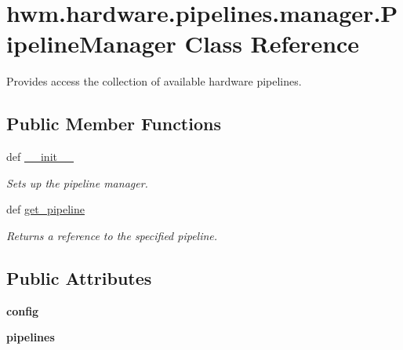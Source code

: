 \hypertarget{classhwm_1_1hardware_1_1pipelines_1_1manager_1_1_pipeline_manager}{\section{hwm.\-hardware.\-pipelines.\-manager.\-Pipeline\-Manager Class Reference}
\label{classhwm_1_1hardware_1_1pipelines_1_1manager_1_1_pipeline_manager}
}


Provides access the collection of available hardware pipelines.  


\subsection*{Public Member Functions}
\begin{DoxyCompactItemize}
\item 
def \hyperlink{classhwm_1_1hardware_1_1pipelines_1_1manager_1_1_pipeline_manager_a88a42b5d8f14bb37d5618cd29452126d}{\-\_\-\-\_\-init\-\_\-\-\_\-}
\begin{DoxyCompactList}\small\item\em Sets up the pipeline manager. \end{DoxyCompactList}\item 
def \hyperlink{classhwm_1_1hardware_1_1pipelines_1_1manager_1_1_pipeline_manager_acd2d1d93204110d7256c8cbb34cde804}{get\-\_\-pipeline}
\begin{DoxyCompactList}\small\item\em Returns a reference to the specified pipeline. \end{DoxyCompactList}\end{DoxyCompactItemize}
\subsection*{Public Attributes}
\begin{DoxyCompactItemize}
\item 
\hypertarget{classhwm_1_1hardware_1_1pipelines_1_1manager_1_1_pipeline_manager_a11e66d6149717d994105088073f3233b}{{\bfseries config}}\label{classhwm_1_1hardware_1_1pipelines_1_1manager_1_1_pipeline_manager_a11e66d6149717d994105088073f3233b}

\item 
\hypertarget{classhwm_1_1hardware_1_1pipelines_1_1manager_1_1_pipeline_manager_a3984be455a8589fa8cc5ec28cb2ffb80}{{\bfseries pipelines}}\label{classhwm_1_1hardware_1_1pipelines_1_1manager_1_1_pipeline_manager_a3984be455a8589fa8cc5ec28cb2ffb80}

\end{DoxyCompactItemize}
